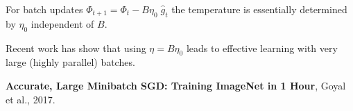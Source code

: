 {\vfill
For batch updates $\Phi_{t+1} = \Phi_t - B\eta_0\; \hat{g}_t$ the temperature is essentially determined by $\eta_0$ independent of $B$.


Recent work has show that using $\eta = B\eta_0$ leads to effective learning with very large (highly parallel)
batches.

\vfill
{\bf Accurate, Large Minibatch SGD: Training ImageNet in 1 Hour}, Goyal et al., 2017.


} 

